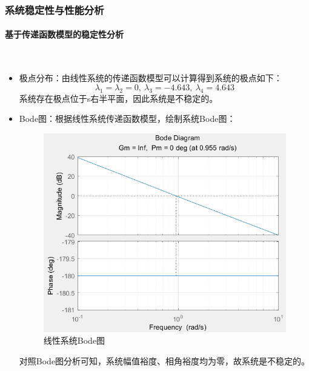 \documentclass[UTF8]{article}
\begin{document}
\subsubsection{系统稳定性与性能分析}

\paragraph{基于传递函数模型的稳定性分析}~{}
\begin{itemize}

\item 极点分布：由线性系统的传递函数模型可以计算得到系统的极点如下：
\begin{equation*}
	\lambda_1 = \lambda_2 = 0,\ \lambda_3 = -4.643,\ \lambda_4 = 4.643
\end{equation*}
系统存在极点位于s右半平面，因此系统是不稳定的。

\item Bode图：根据线性系统传递函数模型，绘制系统Bode图：
\begin{figure}[H]
    \centering %
    \includegraphics[width=.6\textwidth]{figure/倒立摆-bode图.png} 
    \caption{线性系统Bode图} %
\end{figure}
对照Bode图分析可知，系统幅值裕度、相角裕度均为零，故系统是不稳定的。


\end{itemize}
\end{document}
